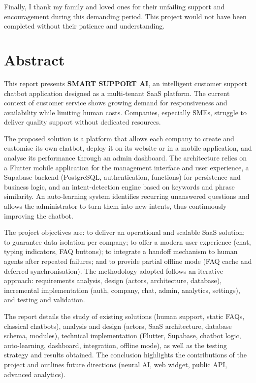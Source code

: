 \documentclass[12pt,a4paper]{report}
\begin{document}
Finally, I thank my family and loved ones for their unfailing support and encouragement during this demanding period. This project would not have been completed without their patience and understanding.

\chapter*{Abstract}

This report presents \textbf{SMART SUPPORT AI}, an intelligent customer support chatbot application designed as a multi-tenant SaaS platform. The current context of customer service shows growing demand for responsiveness and availability while limiting human costs. Companies, especially SMEs, struggle to deliver quality support without dedicated resources.

The proposed solution is a platform that allows each company to create and customise its own chatbot, deploy it on its website or in a mobile application, and analyse its performance through an admin dashboard. The architecture relies on a Flutter mobile application for the management interface and user experience, a Supabase backend (PostgreSQL, authentication, functions) for persistence and business logic, and an intent-detection engine based on keywords and phrase similarity. An auto-learning system identifies recurring unanswered questions and allows the administrator to turn them into new intents, thus continuously improving the chatbot.

The project objectives are: to deliver an operational and scalable SaaS solution; to guarantee data isolation per company; to offer a modern user experience (chat, typing indicators, FAQ buttons); to integrate a handoff mechanism to human agents after repeated failures; and to provide partial offline mode (FAQ cache and deferred synchronisation). The methodology adopted follows an iterative approach: requirements analysis, design (actors, architecture, database), incremental implementation (auth, company, chat, admin, analytics, settings), and testing and validation.

The report details the study of existing solutions (human support, static FAQs, classical chatbots), analysis and design (actors, SaaS architecture, database schema, modules), technical implementation (Flutter, Supabase, chatbot logic, auto-learning, dashboard, integration, offline mode), as well as the testing strategy and results obtained. The conclusion highlights the contributions of the project and outlines future directions (neural AI, web widget, public API, advanced analytics).
\end{document}

